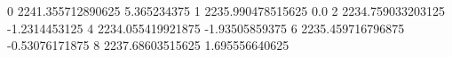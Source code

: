 0 2241.355712890625 5.365234375
1 2235.990478515625 0.0
2 2234.759033203125 -1.2314453125
4 2234.055419921875 -1.93505859375
6 2235.459716796875 -0.53076171875
8 2237.68603515625 1.695556640625
